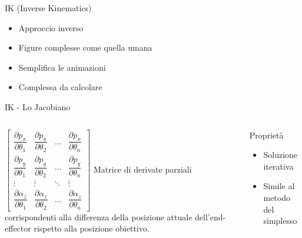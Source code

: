 \documentclass[10pt]{beamer}
\begin{document}
\begin{frame}{IK (Inverse Kinematics)}					
		\begin{itemize}[<+- | alert@+>]							
    \item Approccio inverso											%
    \item Figure complesse come quella umana		%
		\item Semplifica le animazioni							%
    \item Complessa da calcolare                %
  \end{itemize}                                 %
\end{frame}


\begin{frame}[fragile]{IK - Lo Jacobiano}				
  \begin{columns}[T,onlytextwidth]
    $
    \begin{bmatrix}
        \dfrac{\partial p_x}{\partial \theta_1} & \dfrac{\partial p_x}{\partial \theta_2} & \dots & \dfrac{\partial p_x}{\partial \theta_n} \\[2ex]
        \dfrac{\partial p_y}{\partial \theta_1} & \dfrac{\partial p_y}{\partial \theta_2} & \dots & \dfrac{\partial p_y}{\partial \theta_n} \\[2ex]
        \vdots & \vdots & \ddots & \vdots \\[2ex]
        \dfrac{\partial \alpha_z}{\partial \theta_1} & \dfrac{\partial \alpha_z}{\partial \theta_2} & \dots & \dfrac{\partial \alpha_z}{\partial \theta_n} 
    \end{bmatrix}
    $
		Matrice di derivate parziali corrispondenti alla differenza della posizione attuale dell'end-effector rispetto alla posizione obiettivo.
		\begin{alertblock}{Proprietà}	
				\begin{itemize}													%
				\item Soluzione iterativa								%
				\item Simile al metodo del simplesso		%
			\end{itemize}
    \end{alertblock}
	\end{columns}
\end{frame}
\end{document}

